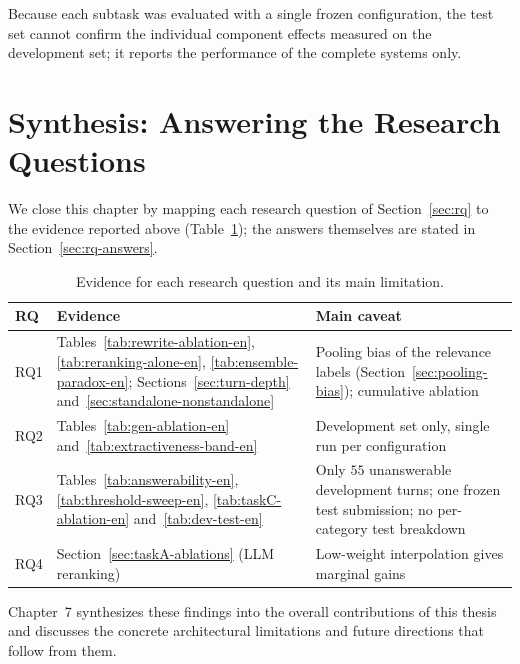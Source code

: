 Because each subtask was evaluated with a single frozen configuration, the test set cannot confirm the individual component effects measured on the development set; it reports the performance of the complete systems only.

\section{Synthesis: Answering the Research Questions}
\label{sec:eval-synthesis}

We close this chapter by mapping each research question of Section~\ref{sec:rq} to the evidence reported above (Table~\ref{tab:rq-evidence}); the answers themselves are stated in Section~\ref{sec:rq-answers}.

\begin{table}[h]
\centering
\small
\begin{tabular}{p{}p{}p{}}
\toprule
\textbf{RQ} & \textbf{Evidence} & \textbf{Main caveat} \\
\midrule
RQ1 & Tables~\ref{tab:rewrite-ablation-en}, \ref{tab:reranking-alone-en}, \ref{tab:ensemble-paradox-en}; Sections~\ref{sec:turn-depth} and~\ref{sec:standalone-nonstandalone} & Pooling bias of the relevance labels (Section~\ref{sec:pooling-bias}); cumulative ablation \\
RQ2 & Tables~\ref{tab:gen-ablation-en} and~\ref{tab:extractiveness-band-en} & Development set only, single run per configuration \\
RQ3 & Tables~\ref{tab:answerability-en}, \ref{tab:threshold-sweep-en}, \ref{tab:taskC-ablation-en} and~\ref{tab:dev-test-en} & Only $55$ unanswerable development turns; one frozen test submission; no per-category test breakdown \\
RQ4 & Section~\ref{sec:taskA-ablations} (LLM reranking) & Low-weight interpolation gives marginal gains \\
\bottomrule
\end{tabular}
\caption{Evidence for each research question and its main limitation.}
\label{tab:rq-evidence}
\end{table}

Chapter~7 synthesizes these findings into the overall contributions of this thesis and discusses the concrete architectural limitations and future directions that follow from them.

